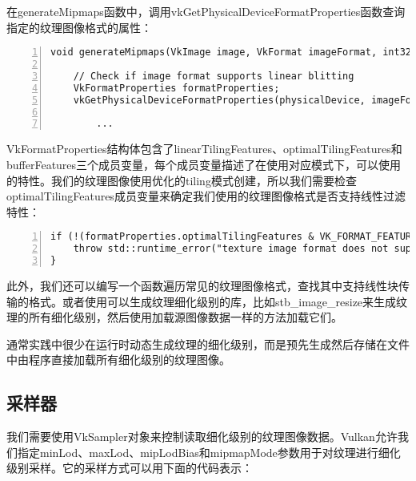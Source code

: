 \documentclass{ctexart}
\begin{document}
在generateMipmaps函数中，调用vkGetPhysicalDeviceFormatProperties函数查询指定的纹理图像格式的属性：

\begin{lstlisting}[language={[ANSI]C},keywordstyle=\color{blue!70},commentstyle=\color{red!50!green!50!blue!50},frame=shadowbox, rulesepcolor=\color{red!20!green!20!blue!20},basicstyle=\small,numbers=left, numberstyle=\tiny,breaklines=true]
void generateMipmaps(VkImage image, VkFormat imageFormat, int32_t texWidth, int32_t texHeight, uint32_t mipLevels) {

	// Check if image format supports linear blitting
	VkFormatProperties formatProperties;
	vkGetPhysicalDeviceFormatProperties(physicalDevice, imageFormat, &formatProperties);

		...
\end{lstlisting}

VkFormatProperties结构体包含了linearTilingFeatures、optimalTilingFeatures和bufferFeatures三个成员变量，每个成员变量描述了在使用对应模式下，可以使用的特性。我们的纹理图像使用优化的tiling模式创建，所以我们需要检查optimalTilingFeatures成员变量来确定我们使用的纹理图像格式是否支持线性过滤特性：

\begin{lstlisting}[language={[ANSI]C},keywordstyle=\color{blue!70},commentstyle=\color{red!50!green!50!blue!50},frame=shadowbox, rulesepcolor=\color{red!20!green!20!blue!20},basicstyle=\small,numbers=left, numberstyle=\tiny,breaklines=true]
if (!(formatProperties.optimalTilingFeatures & VK_FORMAT_FEATURE_SAMPLED_IMAGE_FILTER_LINEAR_BIT)) {
	throw std::runtime_error("texture image format does not support linear blitting!");
}
\end{lstlisting}

此外，我们还可以编写一个函数遍历常见的纹理图像格式，查找其中支持线性块传输的格式。或者使用可以生成纹理细化级别的库，比如stb\_image\_resize来生成纹理的所有细化级别，然后使用加载源图像数据一样的方法加载它们。

通常实践中很少在运行时动态生成纹理的细化级别，而是预先生成然后存储在文件中由程序直接加载所有细化级别的纹理图像。

\subsection{采样器}

我们需要使用VkSampler对象来控制读取细化级别的纹理图像数据。Vulkan允许我们指定minLod、maxLod、mipLodBias和mipmapMode参数用于对纹理进行细化级别采样。它的采样方式可以用下面的代码表示：
\end{document}
